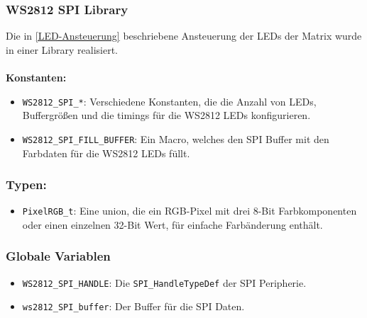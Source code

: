 \subsubsection{WS2812 SPI Library}
Die in \ref{LED-Ansteuerung} beschriebene Ansteuerung der LEDs der Matrix wurde in einer Library realisiert. \\\\
\noindent \textbf{Konstanten:}
{\renewcommand\labelitemi{}
\begin{itemize}[leftmargin=*]
    \item \texttt{WS2812\_SPI\_*}: Verschiedene Konstanten, die die Anzahl von LEDs, Buffergrößen und die timings für die WS2812 LEDs konfigurieren.
    \item \texttt{WS2812\_SPI\_FILL\_BUFFER}: Ein Macro, welches den SPI Buffer mit den Farbdaten für die WS2812 LEDs füllt.
\end{itemize}
}

\subsubsection*{Typen:}
{\renewcommand\labelitemi{}
\begin{itemize}[leftmargin=*]
    \item \texttt{PixelRGB\_t}: Eine union, die ein RGB-Pixel mit drei 8-Bit Farbkomponenten oder einen einzelnen 32-Bit Wert, für einfache Farbänderung enthält.
\end{itemize}
}

\subsubsection*{Globale Variablen}
{\renewcommand\labelitemi{}
\begin{itemize}[leftmargin=*]
    \item \texttt{WS2812\_SPI\_HANDLE}: Die \texttt{SPI\_HandleTypeDef} der SPI Peripherie.
    \item \texttt{ws2812\_SPI\_buffer}: Der Buffer für die SPI Daten.
\end{itemize}
}

